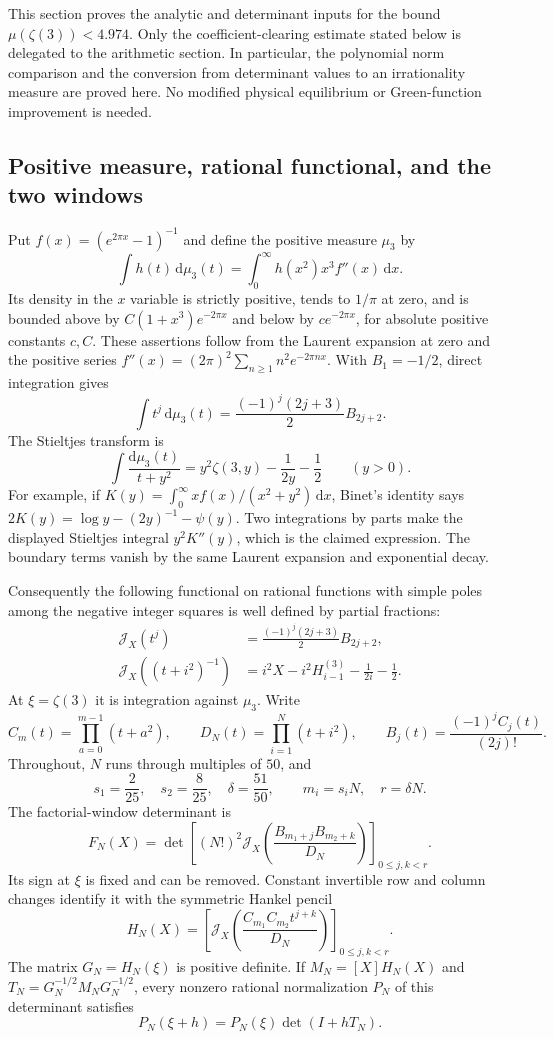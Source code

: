 \documentclass[11pt]{article}
\theoremstyle{definition}\newtheorem{definition}[theorem]{Definition}
\theoremstyle{remark}\newtheorem{remark}[theorem]{Remark}
\begin{document}
This section proves the analytic and determinant inputs for the bound
$\mu(\zeta(3))<4.974$.  Only the coefficient-clearing estimate stated below is
delegated to the arithmetic section.  In particular, the polynomial norm
comparison and the conversion from determinant values to an irrationality
measure are proved here.  No modified physical equilibrium or Green-function
improvement is needed.

\subsection{Positive measure, rational functional, and the two windows}

Put $f(x)=(e^{2\pi x}-1)^{-1}$ and define the positive measure $\mu_3$ by
\[
 \int h(t)\,\mathrm d\mu_3(t)
 =\int_0^\infty h(x^2)x^3f''(x)\,\mathrm dx.
\]
Its density in the $x$ variable is strictly positive, tends to $1/\pi$ at
zero, and is bounded above by $C(1+x^3)e^{-2\pi x}$ and below by
$c e^{-2\pi x}$, for absolute positive constants $c,C$.  These assertions
follow from the Laurent expansion at zero and the positive series
$f''(x)=(2\pi)^2\sum_{n\ge1}n^2e^{-2\pi nx}$.
With $B_1=-1/2$, direct integration gives
\[
 \int t^j\,\mathrm d\mu_3(t)
 =\frac{(-1)^j(2j+3)}2 B_{2j+2}.
\]
The Stieltjes transform is
\[
 \int\frac{\mathrm d\mu_3(t)}{t+y^2}
 =y^2\zeta(3,y)-\frac1{2y}-\frac12\qquad(y>0).
\]
For example, if $K(y)=\int_0^\infty xf(x)/(x^2+y^2)\,\mathrm dx$,
Binet's identity says $2K(y)=\log y-(2y)^{-1}-\psi(y)$.
Two integrations by parts make the displayed Stieltjes integral
$y^2K''(y)$, which is the claimed expression.  The boundary terms vanish
by the same Laurent expansion and exponential decay.

Consequently the following functional on rational functions with simple
poles among the negative integer squares is well defined by partial fractions:
\begin{align*}
 \mathcal J_X(t^j)&=\frac{(-1)^j(2j+3)}2 B_{2j+2},\\
 \mathcal J_X((t+i^2)^{-1})
 &=i^2X-i^2H_{i-1}^{(3)}-\frac1{2i}-\frac12.
\end{align*}
At $\xi=\zeta(3)$ it is integration against $\mu_3$.
Write
\[
 C_m(t)=\prod_{a=0}^{m-1}(t+a^2),\qquad
 D_N(t)=\prod_{i=1}^N(t+i^2),\qquad
 B_j(t)=\frac{(-1)^jC_j(t)}{(2j)!}.
\]
Throughout, $N$ runs through multiples of $50$, and
\[
 s_1=\frac2{25},\quad s_2=\frac8{25},\quad
 \delta=\frac{51}{50},\qquad m_i=s_iN,\quad r=\delta N.
\]
The factorial-window determinant is
\[
 F_N(X)=\det\left[(N!)^2\mathcal J_X
       \left(\frac{B_{m_1+j}B_{m_2+k}}{D_N}\right)
       \right]_{0\le j,k<r}.
\]
Its sign at $\xi$ is fixed and can be removed.  Constant invertible row and
column changes identify it with the symmetric Hankel pencil
\[
 H_N(X)=\left[\mathcal J_X
 \left(\frac{C_{m_1}C_{m_2}t^{j+k}}{D_N}\right)
 \right]_{0\le j,k<r}.
\]
The matrix $G_N=H_N(\xi)$ is positive definite.  If $M_N=[X]H_N(X)$ and
$T_N=G_N^{-1/2}M_NG_N^{-1/2}$, every nonzero rational normalization $P_N$
of this determinant satisfies
\begin{equation}\label{z3a:ratio}
 P_N(\xi+h)=P_N(\xi)\det(I+hT_N).
\end{equation}
\end{document}
